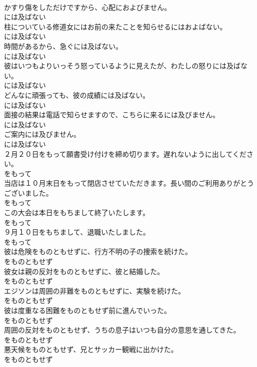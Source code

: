 \documentclass[8pt]{extreport}
\begin{document}
\begin{CJK}{UTF8}{min}
\\	かすり傷をしただけですから、心配におよびません。	
\\	には及ばない
\\	柱についている修道女にはお前の来たことを知らせるにはおよばない。	
\\	には及ばない
\\	時間があるから、急ぐには及ばない。	
\\	には及ばない
\\	彼はいつもよりいっそう怒っているように見えたが、わたしの怒りには及ばない。	
\\	には及ばない
\\	どんなに頑張っても、彼の成績には及ばない。	
\\	には及ばない
\\	面接の結果は電話で知らせますので、こちらに来るには及びません。	
\\	には及ばない
\\	ご案内には及びません。	
\\	には及ばない
\\	２月２０日をもって願書受け付けを締め切ります。遅れないように出してください。	
\\	をもって
\\	当店は１０月末日をもって閉店させていただきます。長い間のご利用ありがとうございました。	
\\	をもって
\\	この大会は本日をもちまして終了いたします。	
\\	をもって
\\	９月１０日をもちまして、退職いたしました。	
\\	をもって
\\	彼は危険をものともせずに、行方不明の子の捜索を続けた。	
\\	をものともせず
\\	彼女は親の反対をものともせずに、彼と結婚した。	
\\	をものともせず
\\	エジソンは周囲の非難をものともせずに、実験を続けた。	
\\	をものともせず
\\	彼は度重なる困難をものともせず前に進んでいった。	
\\	をものともせず
\\	周囲の反対をものともせず、うちの息子はいつも自分の意思を通してきた。	
\\	をものともせず
\\	悪天候をものともせず、兄とサッカー観戦に出かけた。	
\\	をものともせず

\end{CJK}
\end{document}
